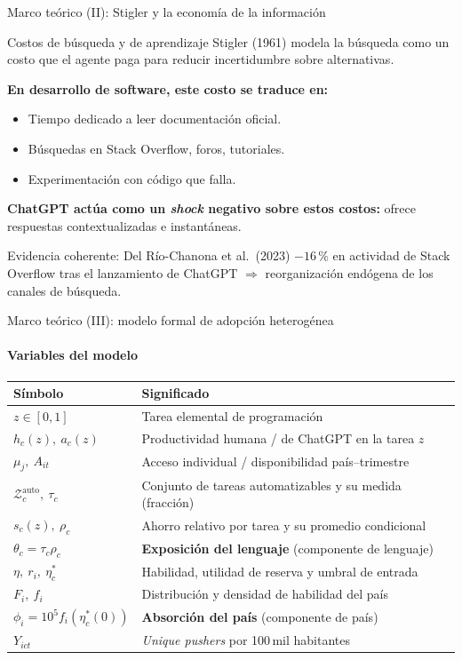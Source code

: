 \documentclass[10pt,aspectratio=169]{beamer}
\begin{document}
\begin{frame}{Marco teórico (II): Stigler y la economía de la información}
\begin{block}{Costos de búsqueda y de aprendizaje}
Stigler (1961) modela la búsqueda como un costo que el agente paga para reducir incertidumbre sobre alternativas.
\end{block}

\textbf{En desarrollo de software, este costo se traduce en:}
\begin{itemize}
  \item Tiempo dedicado a leer documentación oficial.
  \item Búsquedas en Stack Overflow, foros, tutoriales.
  \item Experimentación con código que falla.
\end{itemize}

\vspace{0.5em}
\textbf{ChatGPT actúa como un \textit{shock} negativo sobre estos costos:} ofrece respuestas contextualizadas e instantáneas.

\vspace{0.5em}
\begin{exampleblock}{Evidencia coherente: Del Río-Chanona et al.\ (2023)}
\textbf{$-16\,\%$} en actividad de Stack Overflow tras el lanzamiento de ChatGPT $\Rightarrow$ reorganización endógena de los canales de búsqueda.
\end{exampleblock}
\end{frame}

\begin{frame}{Marco teórico (III): modelo formal de adopción heterogénea}
\framesubtitle{Variables del modelo}
\small
\centering
\renewcommand{\arraystretch}{1.18}
\begin{tabular}{ll}
\toprule
\textbf{Símbolo} & \textbf{Significado} \\
\midrule
$z\in[0,1]$ & Tarea elemental de programación \\
$h_c(z),\ a_c(z)$ & Productividad humana / de ChatGPT en la tarea $z$ \\
$\mu_j,\ A_{it}$ & Acceso individual / disponibilidad país--trimestre \\
$\mathcal{Z}^{\mathrm{auto}}_c,\ \tau_c$ & Conjunto de tareas automatizables y su medida (fracción) \\
$s_c(z),\ \rho_c$ & Ahorro relativo por tarea y su promedio condicional \\
$\theta_c=\tau_c\rho_c$ & \textbf{Exposición del lenguaje} (componente de lenguaje) \\
$\eta,\ r_i,\ \eta^*_c$ & Habilidad, utilidad de reserva y umbral de entrada \\
$F_i,\ f_i$ & Distribución y densidad de habilidad del país \\
$\phi_i=10^5 f_i(\eta^*_c(0))$ & \textbf{Absorción del país} (componente de país) \\
$Y_{ict}$ & \textit{Unique pushers} por 100\,mil habitantes \\
\bottomrule
\end{tabular}
\end{frame}
\end{document}
